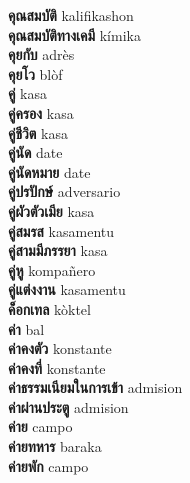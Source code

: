 \textbf{ คุณสมบัติ  } kalifikashon \\
\textbf{ คุณสมบัติทางเคมี  } kímika \\
\textbf{ คุยกับ  } adrès \\
\textbf{ คุยโว  } blòf \\
\textbf{ คู่  } kasa \\
\textbf{ คู่ครอง  } kasa \\
\textbf{ คู่ชีวิต  } kasa \\
\textbf{ คู่นัด  } date \\
\textbf{ คู่นัดหมาย  } date \\
\textbf{ คู่ปรปักษ์  } adversario \\
\textbf{ คู่ผัวตัวเมีย  } kasa \\
\textbf{ คู่สมรส  } kasamentu \\
\textbf{ คู่สามมีภรรยา  } kasa \\
\textbf{ คู่หู  } kompañero \\
\textbf{ คู่แต่งงาน  } kasamentu \\
\textbf{ ค็อกเทล  } kòktel \\
\textbf{ ค่า  } bal \\
\textbf{ ค่าคงตัว  } konstante \\
\textbf{ ค่าคงที่  } konstante \\
\textbf{ ค่าธรรมเนียมในการเข้า  } admision \\
\textbf{ ค่าผ่านประตู  } admision \\
\textbf{ ค่าย  } campo \\
\textbf{ ค่ายทหาร  } baraka \\
\textbf{ ค่ายพัก  } campo \\
